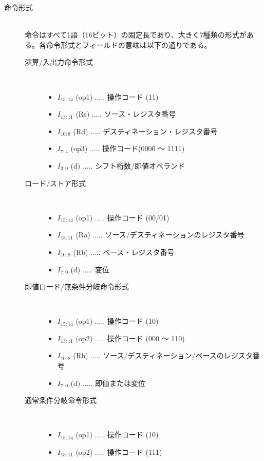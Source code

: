 \documentclass{jarticle}
\begin{document}
\begin{description}
\item[命令形式] \leavevmode \\ 
命令はすべて1語（16ビット）の固定長であり、大きく7種類の形式がある。各命令形式とフィールドの意味は以下の通りである。
\begin{description}
\item[演算/入出力命令形式] \leavevmode \\
\begin{itemize}
\item $I_{15:14}$ (op1) ..... 操作コード (11)
\item $I_{13:11}$ (Rs) ..... ソース・レジスタ番号
\item $I_{10:8}$ (Rd) ..... デスティネーション・レジスタ番号
\item $I_{7:4}$ (op3) ..... 操作コード(0000 〜 1111)
\item $I_{3:0}$ (d) ..... シフト桁数/即値オペランド
\end{itemize}
\item[ロード/ストア形式] \leavevmode \\
\begin{itemize}
\item $I_{15:14}$ (op1) ..... 操作コード (00/01)
\item $I_{13:11}$ (Ra) ..... ソース/デスティネーションのレジスタ番号
\item $I_{10:8}$ (Rb) ..... ベース・レジスタ番号
\item $I_{7:0}$ (d) ..... 変位
\end{itemize}
\item[即値ロード/無条件分岐命令形式] \leavevmode \\
\begin{itemize}
\item $I_{15:14}$ (op1) ..... 操作コード (10)
\item $I_{13:11}$ (op2) ..... 操作コード (000 〜 110)
\item $I_{10:8}$ (Rb) ..... ソース/デスティネーション/ベースのレジスタ番号
\item $I_{7:0}$ (d) ..... 即値または変位
\end{itemize}
\item[通常条件分岐命令形式] \leavevmode \\
\begin{itemize}
\item $I_{15:14}$ (op1) ..... 操作コード (10)
\item $I_{13:11}$ (op2) ..... 操作コード (111)

\end{itemize}
\end{description}
\end{description}
\end{document}
